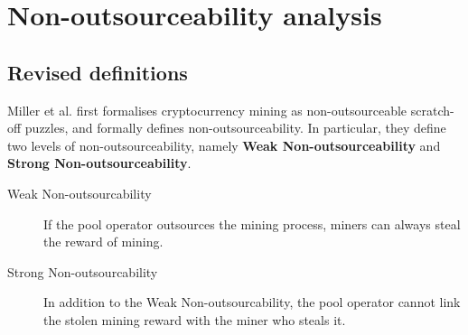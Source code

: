 \section{Non-outsourceability analysis}
\label{sec:non_outsourceability}



\subsection{Revised definitions}

Miller et al. \cite{miller2015nonoutsourceable} first formalises cryptocurrency mining as non-outsourceable scratch-off puzzles, and formally defines non-outsourceability.
In particular, they define two levels of non-outsourceability, namely \textbf{Weak Non-outsourceability} and \textbf{Strong Non-outsourceability}.

\begin{description}
    \item[Weak Non-outsourcability] If the pool operator outsources the mining process, miners can always steal the reward of mining.
    \item[Strong Non-outsourcability] In addition to the Weak Non-outsourcability, the pool operator cannot link the stolen mining reward with the miner who steals it.
\end{description}

